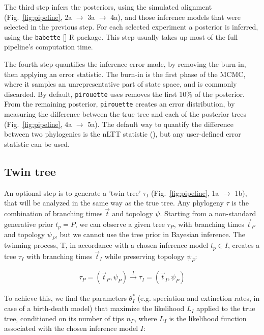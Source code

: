 \documentclass{article}
\begin{document}
The third step infers the posteriors,
using the simulated alignment (Fig.~\ref{fig:pipeline}, 2a $\rightarrow$ 3a $\rightarrow$ 4a),
and those inference models that were selected in the previous step. 
For each selected experiment a posterior is inferred, using the 
\verb;babette; [\cite{bilderbeek2018babette}] R package. 
This step usually takes up most of the full pipeline's computation time.

The fourth step quantifies the inference error made, by removing
the burn-in, then applying an error statistic.
The burn-in is the first phase of the MCMC,
where it samples an unrepresentative part of state space,
and is commonly discarded. By default, \verb;pirouette; 
uses removes the first 10\% of the posterior.
From the remaining posterior, \verb;pirouette; 
creates an error distribution, by measuring the difference
between the true tree and each of the posterior 
trees (Fig.~\ref{fig:pipeline}, 4a $\rightarrow$ 5a).
The default way to quantify the difference between two phylogenies
is the nLTT statistic (\cite{janzen2015approximate}), but any 
user-defined error statistic can be used.

\subsection{Twin tree}\label{subsec:twinning}

An optional step is to generate a 'twin tree' $\tau_{I}$
(Fig.~\ref{fig:pipeline}, 1a $\rightarrow$ 1b),
that will be analyzed in the same way as the true tree.
Any phylogeny $\tau$ is the combination of 
branching times $\Vec{t}$ and topology $\psi$.
Starting from a non-standard generative prior $t_p = \mathit{P}$,
we can observe a given tree $\tau_{\mathit{P}}$,
with branching times $\Vec{t}_{\mathit{P}}$ and 
topology $\psi_{\mathit{P}}$, 
but we cannot use the tree prior in Bayesian inference.
The twinning process, T, in accordance with a chosen inference 
model $t_p \in \mathit{I}$, creates a tree $\tau_{\mathit{I}}$
with branching times $\Vec{t}_{\mathit{I}}$ while preserving 
topology $\psi_{\mathit{P}}$:

\begin{align}
  \tau_{\mathit{P}} = (\Vec{t}_{\mathit{P}}, \psi_{\mathit{P}}) 
  \xrightarrow[]{\mathit{T}} 
  \tau_{\mathit{I}} = (\Vec{t}_{\mathit{I}}, \psi_{\mathit{P}})
\end{align}

To achieve this, we find the parameters $\theta^{*}_{\mathit{I}}$ 
(e.g. speciation and extinction rates, in case of a birth-death model) 
that maximize the likelihood $L_{\mathit{I}}$ applied 
to the true tree, conditioned on its number of tips $n_{\mathit{P}}$,
where $L_{\mathit{I}}$ is  the likelihood function  
associated with the chosen inference model $\mathit{I}$:
\end{document}
